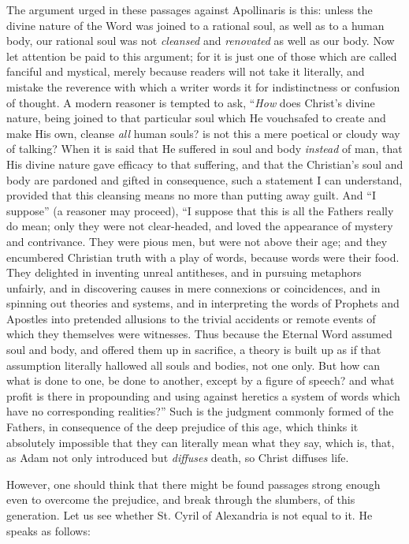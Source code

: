 The argument urged in these passages against
Apollinaris is this: unless the divine nature of the Word was joined
to a rational soul, as well as to a human body, our rational soul was
not \emph{cleansed} and \emph{renovated} as well as our body. Now let
attention be paid to this argument; for it is just one of those which
are called fanciful and mystical, merely because readers will not take
it literally, and mistake the reverence with which a writer words it
for indistinctness or confusion of thought. A modern reasoner is
tempted to ask, ``\emph{How} does Christ's divine nature, being joined
to that particular soul which He vouchsafed to create and make His
own, cleanse \emph{all} human souls? is not this a mere poetical or
cloudy way of talking? When it is said that He suffered in soul and
body \emph{instead} of man, that His divine nature gave efficacy to
that suffering, and that the Christian's soul and body are pardoned
and gifted in consequence, such a statement I can understand, provided
that this cleansing means no more than putting away guilt. And ``I
suppose'' (a reasoner may proceed), ``I suppose that this is all the
Fathers really do mean; only they were not clear-headed, and loved the
appearance of mystery and contrivance. They were pious men, but were
not above their age; and they encumbered Christian truth with a play
of words, because words were their food. They delighted in inventing
unreal antitheses, and in pursuing metaphors unfairly, and in
discovering causes in mere connexions or coincidences, and in spinning
out theories and systems, and in interpreting the words of Prophets
and Apostles into pretended allusions to the trivial accidents or
remote events of which they themselves were witnesses. Thus because
the Eternal Word assumed soul and body, and offered them up in
sacrifice, a theory is built up as if that assumption literally
hallowed all souls and bodies, not one only. But how can what is done
to one, be done to another, except by a figure of speech? and what
profit is there in propounding and using against heretics a system of
words which have no corresponding realities?'' Such is the judgment
commonly formed of the Fathers, in consequence of the deep prejudice
of this age, which thinks it absolutely impossible that they can
literally mean what they say, which is, that, as Adam not only
introduced but \emph{diffuses} death, so Christ diffuses life.

However, one should think that there might be
found passages strong enough even to overcome the prejudice, and break
through the slumbers, of this generation. Let us see whether St. Cyril
of Alexandria is not equal to it. He speaks as follows:

